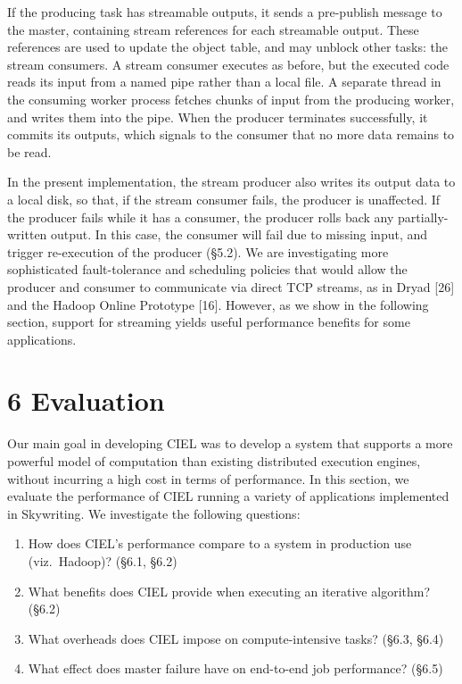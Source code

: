 \documentclass[
]{article}
\providecommand{\tightlist}{%
  \setlength{\itemsep}{0pt}\setlength{\parskip}{0pt}}
\begin{document}
If the producing task has streamable outputs, it sends a pre-publish
message to the master, containing stream references for each streamable
output. These references are used to update the object table, and may
unblock other tasks: the stream consumers. A stream consumer executes as
before, but the executed code reads its input from a named pipe rather
than a local file. A separate thread in the consuming worker process
fetches chunks of input from the producing worker, and writes them into
the pipe. When the producer terminates successfully, it commits its
outputs, which signals to the consumer that no more data remains to be
read.

In the present implementation, the stream producer also writes its
output data to a local disk, so that, if the stream consumer fails, the
producer is unaffected. If the producer fails while it has a consumer,
the producer rolls back any partially-written output. In this case, the
consumer will fail due to missing input, and trigger re-execution of the
producer (§5.2). We are investigating more sophisticated fault-tolerance
and scheduling policies that would allow the producer and consumer to
communicate via direct TCP streams, as in Dryad {[}26{]} and the Hadoop
Online Prototype {[}16{]}. However, as we show in the following section,
support for streaming yields useful performance benefits for some
applications.

\section{6 Evaluation}\label{evaluation}

Our main goal in developing CIEL was to develop a system that supports a
more powerful model of computation than existing distributed execution
engines, without incurring a high cost in terms of performance. In this
section, we evaluate the performance of CIEL running a variety of
applications implemented in Skywriting. We investigate the following
questions:

\begin{enumerate}
\def\labelenumi{\arabic{enumi}.}
\tightlist
\item
  How does CIEL's performance compare to a system in production use
  (viz.~Hadoop)? (§6.1, §6.2)\\
\item
  What benefits does CIEL provide when executing an iterative algorithm?
  (§6.2)\\
\item
  What overheads does CIEL impose on compute-intensive tasks? (§6.3,
  §6.4)\\
\item
  What effect does master failure have on end-to-end job performance?
  (§6.5)
\end{enumerate}
\end{document}
